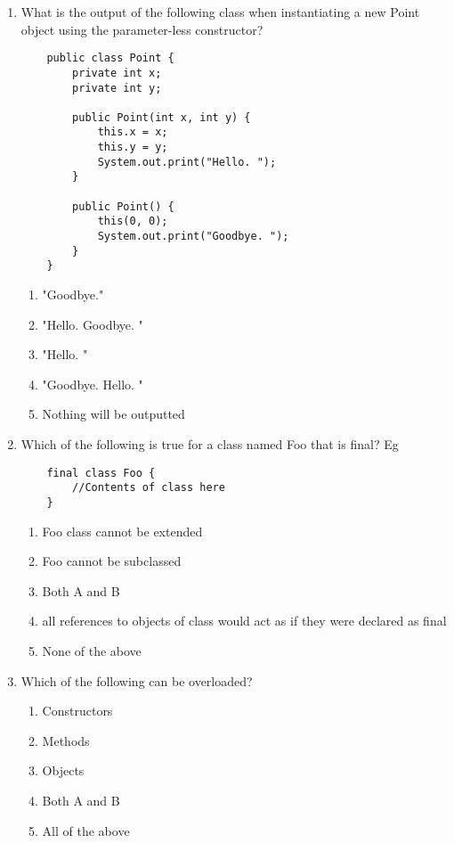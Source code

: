 \documentclass[S17-Final.tex]{subfiles}
\begin{document}
\begin{enumerate}
\item What is the output of the following class when instantiating a new Point object using the parameter-less constructor?
\begin{lstlisting}
    public class Point {
		private int x;
		private int y;
		
		public Point(int x, int y) {
			this.x = x;
			this.y = y;
			System.out.print("Hello. ");
		}
		
		public Point() {
			this(0, 0);
			System.out.print("Goodbye. ");
		}
	}

\end{lstlisting}
	
\begin{enumerate}
\item  "Goodbye."
\item  "Hello. Goodbye. " \ifdraft \Ans \fi 
\item  "Hello. "
\item  "Goodbye. Hello. "
\item  Nothing will be outputted
\end{enumerate}

\item Which of the following is true for a class named Foo that is final? Eg
\begin{lstlisting}
    final class Foo {
		//Contents of class here
    }
\end{lstlisting}
	
\begin{enumerate}
\item  Foo class cannot be extended
\item  Foo cannot be subclassed
\item  Both A and B \ifdraft \Ans \fi 
\item  all references to objects of class would act as if they were declared as final
\item  None of the above
\end{enumerate}


\item Which of the following can be overloaded?
	
\begin{enumerate}
\item  Constructors
\item  Methods
\item  Objects
\item  Both A and B \ifdraft \Ans \fi 
\item  All of the above
\end{enumerate}


\end{enumerate}
\end{document}
